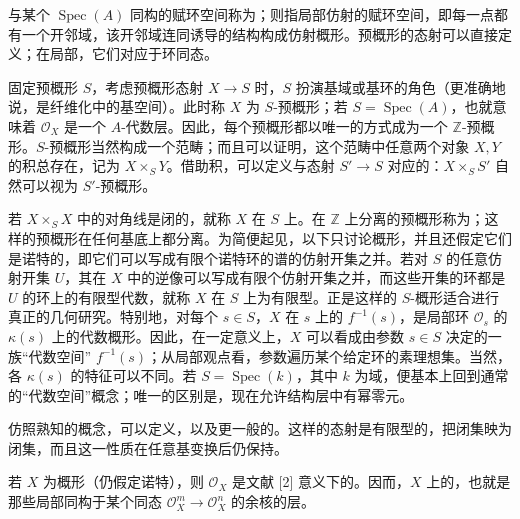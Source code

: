 与某个 $\operatorname{Spec}(A)$ 同构的赋环空间称为；则指局部仿射的赋环空间，即每一点都有一个开邻域，该开邻域连同诱导的结构构成仿射概形。预概形的态射可以直接定义；在局部，它们对应于环同态。

固定预概形 $S$，考虑预概形态射 $X\to S$ 时，$S$ 扮演基域或基环的角色（更准确地说，是纤维化中的基空间）。此时称 $X$ 为 $S$-预概形；若 $S=\operatorname{Spec}(A)$，也就意味着 $\mathcal O_X$ 是一个 $A$-代数层。因此，每个预概形都以唯一的方式成为一个 $\mathbb Z$-预概形。$S$-预概形当然构成一个范畴；而且可以证明，这个范畴中任意两个对象 $X,Y$ 的积总存在，记为 $X\times_S Y$。借助积，可以定义与态射 $S'\to S$ 对应的：$X\times_S S'$ 自然可以视为 $S'$-预概形。

若 $X\times_S X$ 中的对角线是闭的，就称 $X$ 在 $S$ 上。在 $\mathbb Z$ 上分离的预概形称为；这样的预概形在任何基底上都分离。为简便起见，以下只讨论概形，并且还假定它们是诺特的，即它们可以写成有限个诺特环的谱的仿射开集之并。若对 $S$ 的任意仿射开集 $U$，其在 $X$ 中的逆像可以写成有限个仿射开集之并，而这些开集的环都是 $U$ 的环上的有限型代数，就称 $X$ 在 $S$ 上为有限型。正是这样的 $S$-概形适合进行真正的几何研究。特别地，对每个 $s\in S$，$X$ 在 $s$ 上的 $f^{-1}(s)$，是局部环 $\mathcal O_s$ 的 $\kappa(s)$ 上的代数概形。因此，在一定意义上，$X$ 可以看成由参数 $s\in S$ 决定的一族“代数空间” $f^{-1}(s)$；从局部观点看，参数遍历某个给定环的素理想集。当然，各 $\kappa(s)$ 的特征可以不同。若 $S=\operatorname{Spec}(k)$，其中 $k$ 为域，便基本上回到通常的“代数空间”概念；唯一的区别是，现在允许结构层中有幂零元。

仿照熟知的概念，可以定义，以及更一般的。这样的态射是有限型的，把闭集映为闭集，而且这一性质在任意基变换后仍保持。

若 $X$ 为概形（仍假定诺特），则 $\mathcal O_X$ 是文献 [2] 意义下的。因而，$X$ 上的，也就是那些局部同构于某个同态 $\mathcal O_X^m\to\mathcal O_X^n$ 的余核的层。

